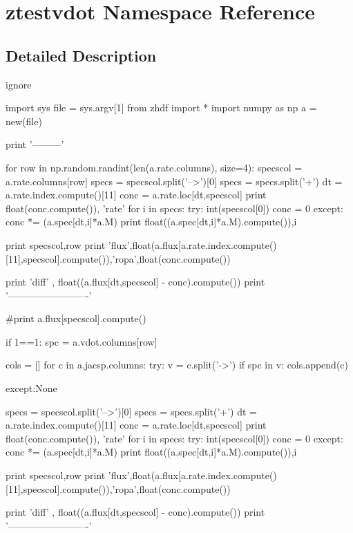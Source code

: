\hypertarget{namespaceztestvdot}{}\section{ztestvdot Namespace Reference}
\label{namespaceztestvdot}


\subsection{Detailed Description}
\begin{DoxyVerb}ignore 

import sys
file = sys.argv[1]
from zhdf import *
import numpy as np
a = new(file)

print '---------'




for row in np.random.randint(len(a.rate.columns), size=4):
specscol = a.rate.columns[row]
specs = specscol.split('-->')[0]
specs = specs.split('+')
dt = a.rate.index.compute()[11]
conc = a.rate.loc[dt,specscol]
print float(conc.compute()), 'rate'
for i in specs:
    try:
        int(specscol[0])
        conc = 0
    except:
        conc *= (a.spec[dt,i]*a.M)
        print float((a.spec[dt,i]*a.M).compute()),i

print specscol,row
print 'flux',float(a.flux[a.rate.index.compute()[11],specscol].compute()),'ropa',float(conc.compute())

print 'diff' , float((a.flux[dt,specscol] - conc).compute())
print '-------------------------'

#print a.flux[specscol].compute()

if 1==1:
spc = a.vdot.columns[row]

cols = []
for c in a.jacsp.columns:
     try:
         v = c.split('->')
         if spc in v:
             cols.append(c)
         
     except:None
    



specs = specscol.split('-->')[0]
specs = specs.split('+')
dt = a.rate.index.compute()[11]
conc = a.rate.loc[dt,specscol]
print float(conc.compute()), 'rate'
for i in specs:
    try:
        int(specscol[0])
        conc = 0
    except:
        conc *= (a.spec[dt,i]*a.M)
        print float((a.spec[dt,i]*a.M).compute()),i

print specscol,row
print 'flux',float(a.flux[a.rate.index.compute()[11],specscol].compute()),'ropa',float(conc.compute())

print 'diff' , float((a.flux[dt,specscol] - conc).compute())
print '-------------------------'\end{DoxyVerb}
 
